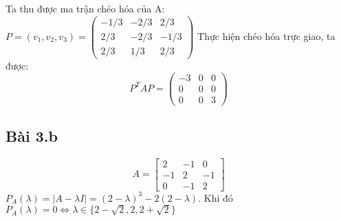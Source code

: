 \documentclass{article}
\begin{document}
Ta thu được ma trận chéo hóa của A: \(
P = (v_1, v_2, v_3) = \begin{pmatrix}
    -1/3 & -2/3 & 2/3  \\
    2/3  & -2/3 & -1/3 \\
    2/3  & 1/3  & 2/3
\end{pmatrix} \)
\newline Thực hiện chéo hóa trực giao, ta được:
\[
    P^TAP = \begin{pmatrix}
        -3 & 0 & 0 \\ 0 & 0 & 0 \\ 0 & 0 & 3
    \end{pmatrix}
\]

\subsection*{Bài 3.b}
\[
    A =
    \begin{bmatrix}
        2 & -1 & 0 \\ -1 & 2 & -1 \\ 0 & -1 & 2
    \end{bmatrix}
\]
\( P_A(\lambda) = |A - \lambda I| = (2-\lambda)^3 - 2(2-\lambda). \)
\newline Khi đó \( P_{A}(\lambda) = 0 \Leftrightarrow \lambda \in \{ 2-\sqrt{2}, 2, 2+\sqrt{2} \} \)
\end{document}
